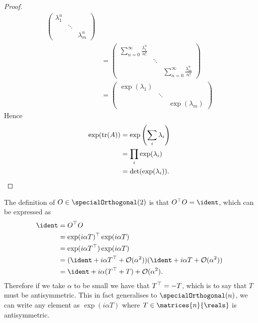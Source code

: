 \begin{lma}{}{}
\begin{proof}
\begin{align}
\begin{pmatrix}
                \lambda_1^n && \\
                & \ddots & \\
                && \lambda_m^n
            \end{pmatrix}
            \\
            &= 
            \begin{pmatrix}
                \sum_{n = 0}^{\infty} \frac{\lambda_1^n}{n!} && \\
                & \ddots & \\
                && \sum_{n = 0}^{\infty} \frac{\lambda_m^n}{n!}
            \end{pmatrix}
            \\
            &= 
            \begin{pmatrix}
                \exp(\lambda_1) && \\
                & \ddots & \\
                && \exp(\lambda_m)
            \end{pmatrix}
        \end{align}
        \endgroup
        Hence
        \begin{align}
            \exp(\operatorname{tr}(A)) &= \exp\left( \sum_{i} \lambda_i \right)\\
            &= \prod_{i} \exp(\lambda_i)\\
            &= \det(\exp(\lambda_i)).
        \end{align}
    \end{proof}
\end{lma}

The definition of \(O \in \specialOrthogonal(2)\) is that \(O^\trans O = \ident\), which can be expressed as
\begin{align}
    \ident &= O^\trans O\\
    &= \exp(i\alpha T)^{\trans} \exp(i\alpha T)\\
    &= \exp(i\alpha T^{\trans}) \exp(i\alpha T)\\
    &= (\ident + i\alpha T^{\trans} + \order(\alpha^2))(\ident + i\alpha T + \order(\alpha^2))\\
    &= \ident + i\alpha(T^\trans + T) + \order(\alpha^2).
\end{align}
Therefore if we take \(\alpha\) to be small we have that \(T^{\top} = -T\), which is to say that \(T\) must be antisymmetric.
This in fact generalises to \(\specialOrthogonal(n)\), we can write any element as \(\exp(i\alpha T)\) where \(T \in \matrices{n}{\reals}\) is antisymmetric.

